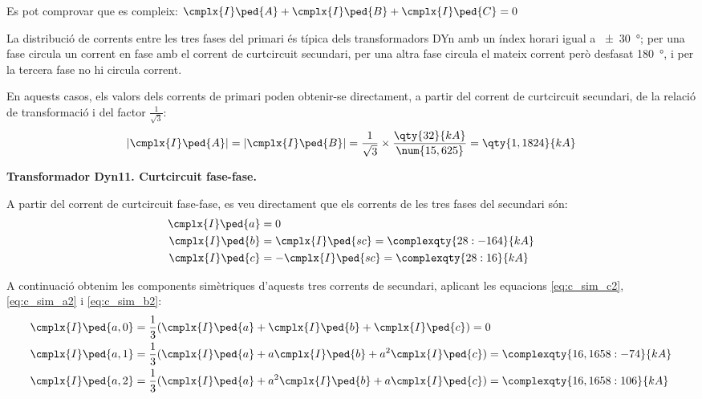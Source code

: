 \begin{exemple}[\CCasimSecTrafo{}]
    Es pot comprovar que es compleix: $\cmplx{I}\ped{A} + \cmplx{I}\ped{B} + \cmplx{I}\ped{C} = 0$

    La distribució de corrents entre les tres fases del primari és típica dels transformadors DYn amb un índex horari igual a \qty{+-30}{\degree}; per una fase circula un corrent en fase amb el corrent de curtcircuit secundari, per una altra fase circula el mateix corrent però desfasat \qty{180}{\degree}, i per la tercera fase no hi circula corrent.

    En aquests casos, els valors dels corrents de primari poden obtenir-se directament, a partir del corrent de curtcircuit secundari, de la relació de transformació i del factor $\frac{1}{\sqrt{3}}$:
    \[
        |\cmplx{I}\ped{A}| = |\cmplx{I}\ped{B}| = \frac{1}{\sqrt{3}} \times \frac{\qty{32}{kA}}{\num{15,625}} = \qty{1,1824}{kA}
    \]

    \textbf{ Transformador Dyn11. Curtcircuit fase-fase.}

    \begin{center}
       
    \end{center}

    A partir del corrent de curtcircuit fase-fase, es veu directament que els corrents de les tres fases del secundari són:
    \begin{align*}
        \cmplx{I}\ped{a} &= 0  \\
        \cmplx{I}\ped{b} &= \cmplx{I}\ped{sc} = \complexqty{28:-164}{kA}  \\
        \cmplx{I}\ped{c} &= -\cmplx{I}\ped{sc} = \complexqty{28:16}{kA}
    \end{align*}

    A continuació obtenim les components simètriques d'aquests tres corrents de secundari, aplicant les equacions \eqref{eq:c_sim_c2}, \eqref{eq:c_sim_a2} i \eqref{eq:c_sim_b2}:
    \begin{align*}
        \cmplx{I}\ped{a,0} &= \frac{1}{3} (\cmplx{I}\ped{a} + \cmplx{I}\ped{b} +
        \cmplx{I}\ped{c}) = 0 \\
        \cmplx{I}\ped{a,1} &= \frac{1}{3} (\cmplx{I}\ped{a} + a \cmplx{I}\ped{b} +
         a^2 \cmplx{I}\ped{c}) = \complexqty{16,1658:-74}{kA}  \\
        \cmplx{I}\ped{a,2} &= \frac{1}{3} (\cmplx{I}\ped{a} + a^2 \cmplx{I}\ped{b} +
         a \cmplx{I}\ped{c}) = \complexqty{16,1658:106}{kA}
    \end{align*}


\end{exemple}
